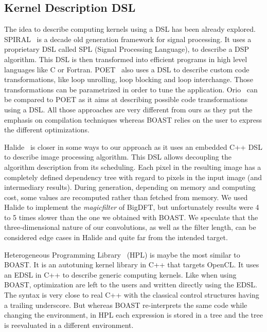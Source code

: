 \documentclass{IEEEtran}
\begin{document}
  \subsection{Kernel Description DSL}

  The idea to describe computing kernels using a DSL has been already explored.
SPIRAL~\cite{puschel2004spiral} is a decade old generation
framework for signal processing. It uses a proprietary DSL called SPL (Signal
Processing Language), to describe a DSP algorithm. This DSL is then transformed
into efficient programs in high level languages like C or Fortran.
POET~\cite{yi2007poet} also uses a DSL to describe custom code transformations,
like loop unrolling, loop blocking and loop interchange. Those transformations
can be parametrized in order to tune the application. Orio~\cite{Hart2009:Orio}
can be compared to POET as it aims at describing possible code transformations
using a DSL. All those approaches are very different from ours as they put the
emphasis on compilation techniques whereas BOAST relies on the user to express
the different optimizations.

  Halide~\cite{ragan2013halide} is closer in some ways to our approach as it
uses an embedded C++ DSL to describe image processing algorithm. This DSL allows
decoupling the algorithm description from its scheduling. Each pixel in the
resulting image has a completely defined dependency tree with regard to pixels
in the input image (and intermediary results). During generation, depending on
memory and computing cost, some values are recomputed rather than fetched from
memory. We used Halide to implement the \emph{magicfilter} of BigDFT, but
unfortunately results were 4 to 5 times slower than the one we obtained with
BOAST. We speculate that the three-dimensional nature of our convolutions, as
well as the filter length, can be considered edge cases in Halide and quite far
from the intended target.

  Heterogeneous Programming Library~\cite{vinas2013exploiting} (HPL) is maybe
the most similar to BOAST. It is an autotuning kernel library in C++ that targets
OpenCL. It uses an EDSL in C++ to describe generic computing kernels. Like when
using BOAST, optimization are left to the users and written directly using the
EDSL. The syntax is very close to real C++ with the classical control
structures having a trailing underscore. But whereas BOAST re-interprets the
same code while changing the environment, in HPL each expression is stored in a
tree and the tree is reevaluated in a different environment.
\end{document}
